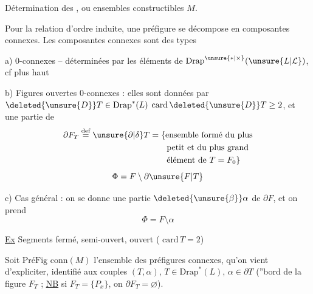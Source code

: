 Détermination des , ou ensembles constructibles  $M$.

 Pour la relation d'ordre induite, une préfigure se décompose en composantes connexes. Les composantes connexes  sont des types  


a)  \uline{} $0$-connexes  -- déterminées par les éléments de $\mathrm{Drap}^{\unsure{*|\times}}(\unsure{L|\mathcal L})$, cf plus haut

b) Figures  ouvertes $0$-connexes :  elles sont données par $\deleted{\unsure{D}}T\in\mathrm{Drap}^{*}(L)$ \uline{$\mathrm{card}\,\deleted{\unsure{D}}T\geq 2$}, et une partie de
\[
\begin{aligned}
 \partial F_T\overset{\text{def}}{=}\unsure{\partial|\delta}T
 &=\{\text{ensemble formé du plus}\\
 &\qquad\text{petit et du plus grand}\\
 &\qquad\text{élément de }T=F_0\}
\end{aligned}
\]
\[
 \Phi=F\setminus\partial\unsure{F|T}
\]

c) Cas général : on se donne une partie $\deleted{\unsure{\beta}}\alpha$ de $\partial F$, et on prend
\[
 \Phi=F\setminus\alpha
\]

\uline{Ex} Segments fermé, semi-ouvert, ouvert ( $\mathrm{card}\,T=2$)

Soit $\text{PréFig conn}(M)$ l'ensemble des préfigures connexes, qu'on vient d'expliciter, identifié aux couples $(T,\alpha)$, $T\in\mathrm{Drap}^{*}(L)$, $\alpha\in\partial T$ (''bord de la figure  $F_T$ ; \uline{NB} si $F_T=\{P_x\}$, on   $\partial F_T=\varnothing$).

